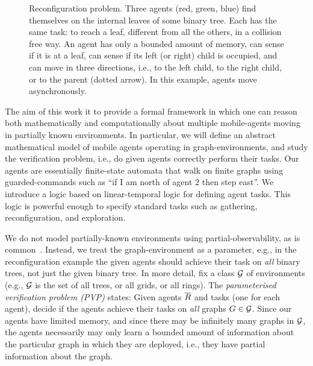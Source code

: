 \begin{figure}[h] \label{fig:tree}
\center {\scalebox{.4}{

}}
\caption{Reconfiguration problem. Three agents (red, green, blue) find themselves on the internal leaves of some binary tree. Each has the same task: to reach a leaf, different from all the others, in a collision free way. An agent has only a bounded amount of memory, can sense if it is at a leaf, can sense if its left (or right) child is occupied, and can move in three directions, i.e., to the left child, to the right child, or to the parent (dotted arrow). In this example, agents move asynchronously.}
\end{figure}

The aim of this work it to provide a formal framework in which one can reason both mathematically and computationally about multiple mobile-agents moving in partially known environments. In particular, we will define an abstract mathematical model of mobile agents operating in graph-environments, and study the verification problem, i.e., do given agents correctly perform their tasks. 
Our agents are essentially finite-state automata that walk on finite graphs using guarded-commands such as ``if I am north of agent $2$ then step east''. 
We introduce a logic based on linear-temporal logic \LTL for defining agent tasks. This logic is powerful enough to specify standard tasks such as gathering, reconfiguration, and exploration.

We do not model partially-known environments using partial-observability, as is common~\cite{RuNo-AI}. Instead, we
treat the graph-environment as a parameter, e.g., in the reconfiguration example the given agents should achieve their task on {\em all} binary trees, not just the given binary tree. In more detail, fix a class $\mathcal{G}$ of environments (e.g., $\mathcal{G}$ is the set of all trees, or all grids, or all rings).  The {\em parameterised verification problem (PVP)} states: Given agents $\overline{R}$ and tasks (one for each agent), decide if the agents achieve their tasks on \emph{all} graphs $G \in \mathcal{G}$. Since our agents have limited memory, and since there may be infinitely many graphs in $\mathcal{G}$, the agents necessarily may only learn a bounded amount of information about the particular graph in which they are deployed, i.e., they have partial information about the graph.  


